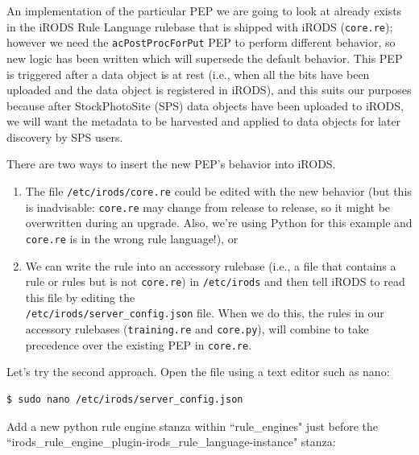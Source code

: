 \documentclass[10pt,oneside]{memoir}
\begin{document}
\vspace{5mm}
\begin{lrbox}{\lstPythonRulebase}

\end{lrbox}
\href{https://raw.githubusercontent.com/irods/irods_training/ugm2019/beginner/core.py}{\usebox{\lstPythonRulebase}}

An implementation of the particular PEP we are going to look at already exists in the iRODS Rule Language rulebase that is shipped with iRODS (\texttt{core.re}); however we need the \texttt{acPostProcForPut} PEP to perform different behavior, so new logic has been written which will supersede the default behavior. This PEP is triggered after a data object is at rest (i.e., when all the bits have been uploaded and the data object is registered in iRODS), and this suits our purposes because after StockPhotoSite (SPS) data objects have been uploaded to iRODS, we will want the metadata to be harvested and applied to data objects for later discovery by SPS users.

There are two ways to insert the new PEP's behavior into iRODS.
\begin{enumerate}
 \item The file \texttt{/etc/irods/core.re} could be edited with the new behavior (but this is inadvisable: \texttt{core.re} may change from release to release, so it might be overwritten during an upgrade.  Also, we're using Python for this example and \texttt{core.re} is in the wrong rule language!), or
 \item We can write the rule into an accessory rulebase (i.e., a file that contains a rule or rules but is not \texttt{core.re}) in \texttt{/etc/irods} and then tell iRODS to read this file by editing the \\ \texttt{/etc/irods/server\_config.json} file. When we do this, the rules in our accessory rulebases (\texttt{training.re} and \texttt{core.py}), will combine to take precedence over the existing PEP in \texttt{core.re}.
\end{enumerate}

Let's try the second approach. Open the file using a text editor such as nano:

\begin{lstlisting}
$ sudo nano /etc/irods/server_config.json
\end{lstlisting}

Add a new python rule engine stanza within ``rule\_engines" just before the ``irods\_rule\_engine\_plugin-irods\_rule\_language-instance" stanza:
\end{document}
